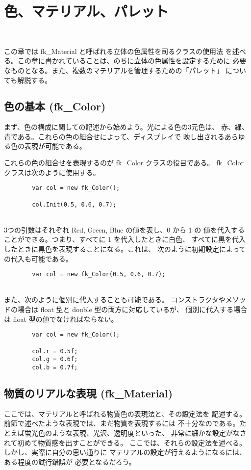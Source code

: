 \chapter{色、マテリアル、パレット} \label{chap:material} ~

この章では fk\_Material と呼ばれる立体の色属性を司るクラスの使用法
を述べる。この章に書かれていることは、のちに立体の色属性を設定するために
必要なものとなる。また、複数のマテリアルを管理するための「パレット」
についても解説する。
\section{色の基本 (fk\_Color)}
まず、色の構成に関しての記述から始めよう。光による色の3元色は、
赤、緑、青である。これらの色の組合せによって、ディスプレイで
映し出されるあらゆる色の表現が可能である。

これらの色の組合せを表現するのが fk\_Color クラスの役目である。
fk\_Color クラスは次のように使用する。
\\
\begin{screen}
\begin{verbatim}
        var col = new fk_Color();

        col.Init(0.5, 0.6, 0.7);
\end{verbatim}
\end{screen}
~ \\
3つの引数はそれぞれ Red, Green, Blue の値を表し、0 から 1 の
値を代入することができる。つまり、すべてに 1 を代入したときに白色、
すべてに黒を代入したときに黒色を表現することになる。これは、
次のように初期設定によっての代入も可能である。
\\
\begin{screen}
\begin{verbatim}
        var col = new fk_Color(0.5, 0.6, 0.7);
\end{verbatim}
\end{screen}
~ \\
また、次のように個別に代入することも可能である。
コンストラクタやメソッドの場合は float 型と double 型の両方に対応しているが、
個別に代入する場合は float 型の値でなければならない。
\\
\begin{screen}
\begin{verbatim}
        var col = new fk_Color();

        col.r = 0.5f;
        col.g = 0.6f;
        col.b = 0.7f;
\end{verbatim}
\end{screen}
\section{物質のリアルな表現 (fk\_Material)}
ここでは、マテリアルと呼ばれる物質色の表現法と、その設定法を
記述する。前節で述べたような表現では、まだ物質を表現するには
不十分なのである。たとえば蛍光色のような表現、光沢、透明度といった、
非常に細かな設定がなされて初めて物質感を出すことができる。
ここでは、それらの設定法を述べる。しかし、実際に自分の思い通りに
マテリアルの設定が行えるようになるには、ある程度の試行錯誤が
必要となるだろう。

